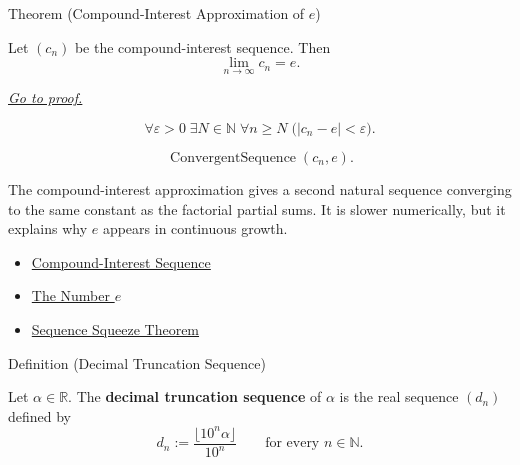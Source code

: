 
\begin{theorembox}{Theorem (Compound-Interest Approximation of $e$)}
\begin{theorem}
\label{thm:compound-interest-approximation-e}
Let $(c_n)$ be the compound-interest sequence. Then
\[
  \lim_{n\to\infty}c_n=e.
\]

\smallskip
\noindent
\hyperref[prf:compound-interest-approximation-e]{\textit{Go to proof.}}
\end{theorem}
\end{theorembox}

\begin{remark*}
\[
\forall \varepsilon>0\;\exists N\in\mathbb{N}\;\forall n\ge N
\;\bigl(|c_n-e|<\varepsilon\bigr).
\]
\end{remark*}

\begin{remark*}
\[
\operatorname{ConvergentSequence}(c_n,e).
\]
\end{remark*}

\begin{remark*}[Interpretation]
The compound-interest approximation gives a second natural sequence
converging to the same constant as the factorial partial sums. It is slower
numerically, but it explains why $e$ appears in continuous growth.
\end{remark*}

\begin{remark*}[Dependencies]\hfill
\begin{itemize}
  \item \hyperref[def:compound-interest-sequence]{Compound-Interest Sequence}
  \item \hyperref[def:number-e]{The Number $e$}
  \item \hyperref[thm:sequence-squeeze-theorem]{Sequence Squeeze Theorem}
\end{itemize}
\end{remark*}


\begin{definitionbox}{Definition (Decimal Truncation Sequence)}
\begin{definition}
\label{def:decimal-truncation-sequence}
Let $\alpha\in\mathbb{R}$. The \textbf{decimal truncation sequence} of
$\alpha$ is the real sequence $(d_n)$ defined by
\[
  d_n:=\frac{\lfloor 10^n\alpha\rfloor}{10^n}
  \qquad\text{for every } n\in\mathbb{N}.
\]
\end{definition}
\end{definitionbox}

